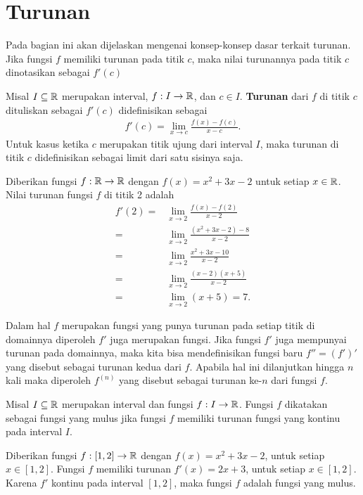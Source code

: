 \section{Turunan}
Pada bagian ini akan dijelaskan mengenai konsep-konsep dasar terkait turunan. Jika fungsi $f$ memiliki turunan pada titik $c$, maka nilai turunannya pada titik $c$ dinotasikan sebagai $f'(c)$
\begin{definisi}
    Misal $I \subseteq \mathbb{R}$ merupakan interval, $f:I \to \mathbb{R}$, dan $c \in I$. \textbf{Turunan} dari $f$ di titik $c$ dituliskan sebagai $f'(c)$ didefinisikan sebagai
    \begin{align*}
        f'(c)=\lim_{x \to c}\frac{f(x)-f(c)}{x-c}.
    \end{align*}
    Untuk kasus ketika $c$ merupakan titik ujung dari interval $I$, maka turunan di titik $c$ didefinisikan sebagai limit dari satu sisinya saja.
\end{definisi}
\newpage
\begin{contoh}
    Diberikan fungsi $f:\mathbb{R}\to\mathbb{R}$ dengan $f(x)=x^2+3x-2$ untuk setiap $x\in\mathbb{R}$. Nilai turunan fungsi $f$ di titik 2 adalah
    \begin{align*}
        f'(2)=&\lim_{x\to2}\frac{f(x)-f(2)}{x-2}\\
        =&\lim_{x\to2}\frac{(x^2+3x-2)-8}{x-2}\\
        =&\lim_{x\to2}\frac{x^2+3x-10}{x-2}\\
        =&\lim_{x\to2}\frac{(x-2)(x+5)}{x-2}\\
        =&\lim_{x\to2}(x+5)=7.
    \end{align*}
\end{contoh}
Dalam hal $f$ merupakan fungsi yang punya turunan pada setiap titik di domainnya diperoleh $f'$ juga merupakan fungsi. Jika fungsi $f'$ juga mempunyai turunan pada domainnya, maka kita bisa mendefinisikan fungsi baru $f''=(f')'$ yang disebut sebagai turunan kedua dari $f$. Apabila hal ini dilanjutkan hingga $n$ kali maka diperoleh $f^{(n)}$ yang disebut sebagai turunan ke-$n$ dari fungsi $f$. 

\begin{definisi}
Misal $I \subseteq \mathbb{R}$ merupakan interval dan fungsi $f:I \to \mathbb{R}$. Fungsi $f$ dikatakan sebagai fungsi yang mulus jika fungsi $f$ memiliki turunan fungsi yang kontinu pada interval $I$.
\end{definisi}
\begin{contoh}
    Diberikan fungsi $f:[1,2] \to\mathbb{R}$ dengan $f(x)=x^2+3x-2$, untuk setiap $x\in [1,2]$. Fungsi $f$ memiliki turunan $f'(x) = 2x + 3$,  untuk setiap $x\in [1,2]$. Karena $f'$ kontinu pada interval $[1,2]$, maka fungsi $f$ adalah fungsi yang mulus.
\end{contoh}

